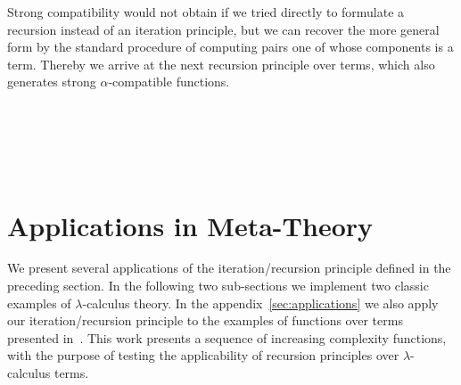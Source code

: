 \documentclass{entcs}
\newcommand{\alp}{\ensuremath{\alpha}}
\newcommand{\lamb}{\ensuremath{\lambda}}
\begin{document}
Strong compatibility would not obtain if we tried directly to formulate a recursion instead of an iteration principle, but we can recover the more general form by the standard procedure of computing pairs one of whose components is a term. Thereby we arrive at  the next recursion principle over terms, which also generates strong \alp-compatible functions.


\begin{code}%
\> \<[6]%
\>[6]\AgdaSymbol{:} \AgdaSymbol{\{} \AgdaSymbol{:} \AgdaSymbol{\}(} \AgdaSymbol{:}  \AgdaSymbol{)}\<%
\\
\>[2]\<[6]%
\>[6] \AgdaSymbol{(}  \AgdaSymbol{)}\<%
\\
\>[2]\<[6]%
\>[6] \AgdaSymbol{(}        \AgdaSymbol{)}\<%
\\
\>[2]\<[6]%
\>[6]    \AgdaSymbol{(}      \AgdaSymbol{)} \<[39]%
\>[39]\<%
\\
\>[2]\<[6]%
\>[6]   \<%
\end{code}


\section{Applications in Meta-Theory}
\label{sec:itapp}

We present several applications of the iteration/recursion principle defined in the preceding section. In the following two sub-sections we implement two classic examples of \lamb-calculus theory. In the appendix~\ref{sec:applications} we also apply our iteration/recursion principle to the examples of functions over terms presented in~\cite{Norrish04recursivefunction}. This work presents a sequence of increasing complexity functions,  with the purpose of testing the applicability of recursion principles over \lamb-calculus terms. 
\end{document}
